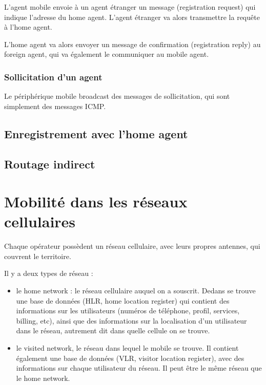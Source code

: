   	
			L'agent mobile envoie à un agent étranger un message (registration request) qui indique l'adresse du home agent. L'agent étranger va alors transmettre la requête à l'home agent.
  	
			L'home agent va alors envoyer un message de confirmation (registration reply) au foreign agent, qui va également le communiquer au mobile agent.
		
		
			\subsubsection{Sollicitation d'un agent}
			
			Le périphérique mobile broadcast des messages de sollicitation, qui sont simplement des messages ICMP. 	
		
		\subsection{Enregistrement avec l'home agent}
		
		\subsection{Routage indirect}
  
		
  	
  	
  	
	\section{Mobilité dans les réseaux cellulaires}
	
	
	
	Chaque opérateur possèdent un réseau cellulaire, avec leurs propres antennes, qui couvrent le territoire.
	
	Il y a deux types de réseau :
	
	\begin{itemize}
		\item le home network : le réseau cellulaire auquel on a souscrit. Dedans se trouve une base de données (HLR, home location register) qui contient des informations sur les utilisateurs (numéros de téléphone, profil, services, billing, etc), ainsi que des informations sur la localisation d'un utilisateur dans le réseau, autrement dit dans quelle cellule on se trouve.
		
		\item le visited network, le réseau dans lequel le mobile se trouve. Il contient également une base de données (VLR, visitor location register), avec des informations sur chaque utilisateur du réseau. Il peut être le même réseau que le home network.
	\end{itemize}

